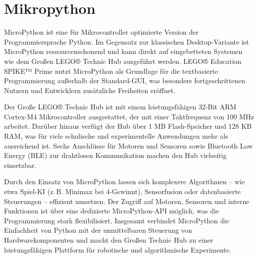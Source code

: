 \chapter{Mikropython}


MicroPython ist eine für Mikrocontroller optimierte Version der Programmiersprache Python. Im Gegensatz zur klassischen Desktop-Variante ist MicroPython ressourcenschonend und kann direkt auf eingebetteten Systemen wie dem Großen LEGO® Technic Hub ausgeführt werden. LEGO® Education SPIKE™ Prime nutzt MicroPython als Grundlage für die textbasierte Programmierung außerhalb der Standard-GUI, was besonders fortgeschrittenen Nutzern und Entwicklern zusätzliche Freiheiten eröffnet.

Der Große LEGO® Technic Hub ist mit einem leistungsfähigen 32-Bit ARM Cortex-M4 Mikrocontroller ausgestattet, der mit einer Taktfrequenz von 100 MHz arbeitet. Darüber hinaus verfügt der Hub über 1 MB Flash-Speicher und 128 KB RAM, was für viele schulische und experimentelle Anwendungen mehr als ausreichend ist. Sechs Anschlüsse für Motoren und Sensoren sowie Bluetooth Low Energy (BLE) zur drahtlosen Kommunikation machen den Hub vielseitig einsetzbar.

Durch den Einsatz von MicroPython lassen sich komplexere Algorithmen – wie etwa Spiel-KI (z.\,B. Minimax bei 4-Gewinnt), Sensorfusion oder datenbasierte Steuerungen – effizient umsetzen. Der Zugriff auf Motoren, Sensoren und interne Funktionen ist über eine dedizierte MicroPython-API möglich, was die Programmierung stark flexibilisiert. Insgesamt verbindet MicroPython die Einfachheit von Python mit der unmittelbaren Steuerung von Hardwarekomponenten und macht den Großen Technic Hub zu einer leistungsfähigen Plattform für robotische und algorithmische Experimente.
